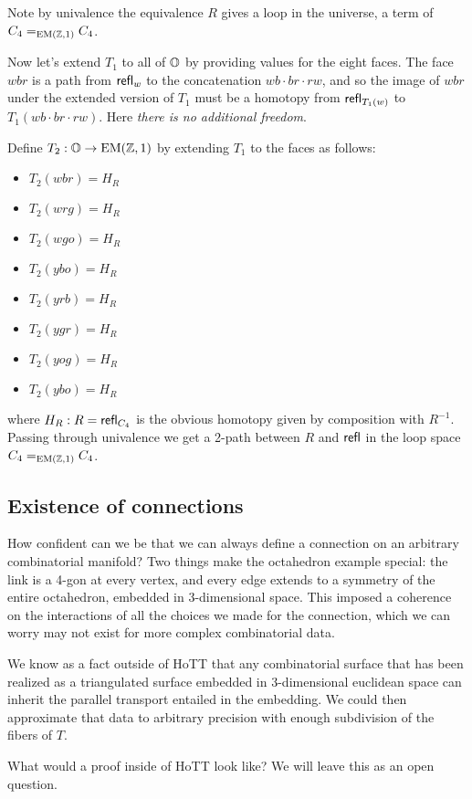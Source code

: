 Note by univalence the equivalence \( R \) gives a loop in the universe, a term of \( C_4=_{\mathrm{EM}(\mathbb{Z},1)}C_4 \).

Now let's extend \( T_1 \) to all of \( \mathbb{O} \) by providing values for the eight faces. The face \( wbr \) is a path from \( \mathsf{refl}_w \) to the concatenation \( wb\cdot br\cdot rw \), and so the image of \( wbr \) under the extended version of \( T_1 \) must be a homotopy from \( \mathsf{refl}_{T_1(w)} \) to \( T_1(wb\cdot br\cdot rw) \). Here \emph{there is no additional freedom}.

\begin{mydef}
\label{def:octahedron_curvature}
Define \( T_2:\mathbb{O}\to\mathrm{EM}(\mathbb{Z},1) \) by extending \( T_1 \) to the faces as follows:
\begin{multicols}{2}
\begin{itemize}
\item \( T_2(wbr)=H_R \) 
\item \( T_2(wrg)=H_R \)
\item \( T_2(wgo)=H_R \)
\item \( T_2(ybo)=H_R \)
\item \( T_2(yrb)=H_R \) 
\item \( T_2(ygr)=H_R \)
\item \( T_2(yog)=H_R \)
\item \( T_2(ybo)=H_R \)
\end{itemize}
\end{multicols}
where \( H_R:R=\mathsf{refl}_{C_4} \) is the obvious homotopy given by composition with \( R^{-1} \). Passing through univalence we get a 2-path between \( R \) and \( \mathsf{refl} \) in the loop space \( C_4=_{\mathrm{EM}(\mathbb{Z},1)}C_4 \).
\end{mydef}

\subsection{Existence of connections}

How confident can we be that we can always define a connection on an arbitrary combinatorial manifold? Two things make the octahedron example special: the link is a 4-gon at every vertex, and every edge extends to a symmetry of the entire octahedron, embedded in 3-dimensional space. This imposed a coherence on the interactions of all the choices we made for the connection, which we can worry may not exist for more complex combinatorial data.

We know as a fact outside of HoTT that any combinatorial surface that has been realized as a triangulated surface embedded in 3-dimensional euclidean space can inherit the parallel transport entailed in the embedding. We could then approximate that data to arbitrary precision with enough subdivision of the fibers of \( T \).

What would a proof inside of HoTT look like? We will leave this as an open question.

